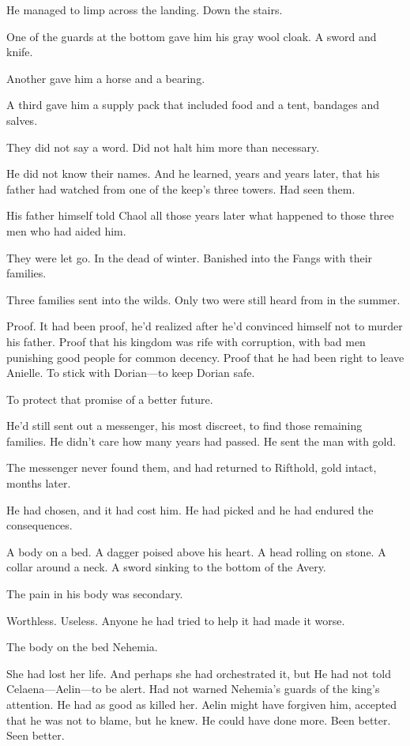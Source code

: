 He managed to limp across the landing. Down the stairs.

One of the guards at the bottom gave him his gray wool cloak. A sword and knife.

Another gave him a horse and a bearing.

A third gave him a supply pack that included food and a tent, bandages and salves.

They did not say a word. Did not halt him more than necessary.

He did not know their names. And he learned, years and years later, that his father had watched from one of the keep's three towers. Had seen them.

His father himself told Chaol all those years later what happened to those three men who had aided him.

They were let go. In the dead of winter. Banished into the Fangs with their families.

Three families sent into the wilds. Only two were still heard from in the summer.

Proof. It had been proof, he'd realized after he'd convinced himself not to murder his father. Proof that his kingdom was rife with corruption, with bad men punishing good people for common decency. Proof that he had been right to leave Anielle. To stick with Dorian---to keep Dorian safe.

To protect that promise of a better future.

He'd still sent out a messenger, his most discreet, to find those remaining families. He didn't care how many years had passed. He sent the man with gold.

The messenger never found them, and had returned to Rifthold, gold intact, months later.

He had chosen, and it had cost him. He had picked and he had endured the consequences.

A body on a bed. A dagger poised above his heart. A head rolling on stone. A collar around a neck. A sword sinking to the bottom of the Avery.

The pain in his body was secondary.

Worthless. Useless. Anyone he had tried to help  it had made it worse.

The body on the bed  Nehemia.

She had lost her life. And perhaps she had orchestrated it, but 
He had not told Celaena---Aelin---to be alert. Had not warned Nehemia's guards of the king's attention. He had as good as killed her. Aelin might have forgiven him, accepted that he was not to blame, but he knew. He could have done more. Been better. Seen better.

